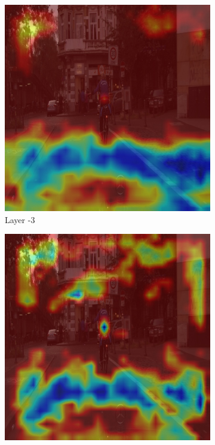 \begin{figure}[h!]
\begin{subfigure}[b]{0.49\textwidth}
        \includegraphics[width=\textwidth]{figures/bonn_000036_000019_leftImg8bit.pnglayer-3/bonn_000036_000019_leftImg8bit.png_object(0)_heatmap}
        \caption{Layer -3}
        \label{fig:b-3}
    \end{subfigure}
    \hfill
    \begin{subfigure}[b]{0.49\textwidth}
        \centering
        \includegraphics[width=\textwidth]{figures/bonn_000036_000019_leftImg8bit.pnglayer-4/bonn_000036_000019_leftImg8bit.png_object(0)_heatmap}

\end{subfigure}
\end{figure}
